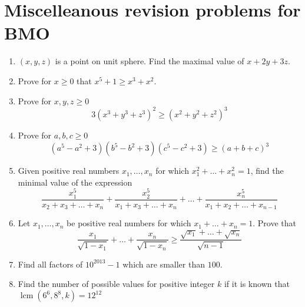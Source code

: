 \documentclass{article}
\DeclareMathOperator{\lcm}{lcm}
\begin{document}
\section*{Miscelleanous revision problems for BMO}

\begin{enumerate}
  \item $(x,y,z)$ is a point on unit sphere. Find the maximal value of $x+2y+3z$.

  \item Prove for $x \geq 0$ that $x^5+1 \geq x^3 + x^2$.
  \item Prove for $x,y,z \geq 0$
  $$3(x^3+y^3+z^3)^2 \geq (x^2+y^2+z^2)^3 $$
  \item Prove for $a,b,c \geq 0$
  $$(a^5-a^2+3)(b^5-b^2+3)(c^5-c^2+3)\geq (a+b+c)^3$$

	\item Given positive real numbers $x_1,\dots,x_n$ for which $x_1^2+\dots+x_n^2=1$, find the minimal value of the expression
	$$\frac{x_1^5}{x_2+x_3+\dots+x_n} + \frac{x_2^5}{x_1+x_3+\dots+x_n} + \dots +\frac{x_n^5}{x_1+x_2+\dots+x_{n-1}}$$

	\item Let $x_1,\dots,x_n$ be positive real numbers for which $x_1+\dots+x_n=1$. Prove that
	$$\frac{x_1}{\sqrt{1-x_1}} + \dots + \frac{x_n}{\sqrt{1-x_n}}
	\geq
	\frac{\sqrt{x_1}+\dots+\sqrt{x_n}}{\sqrt{n-1}} $$

  \item %
  Find all factors of $10^{2013}-1$ which are smaller than $100$.

  \item %
  Find the number of possible values for positive integer $k$ if it is known that $\lcm(6^6,8^8,k)=12^{12}$

\end{enumerate}
\end{document}
